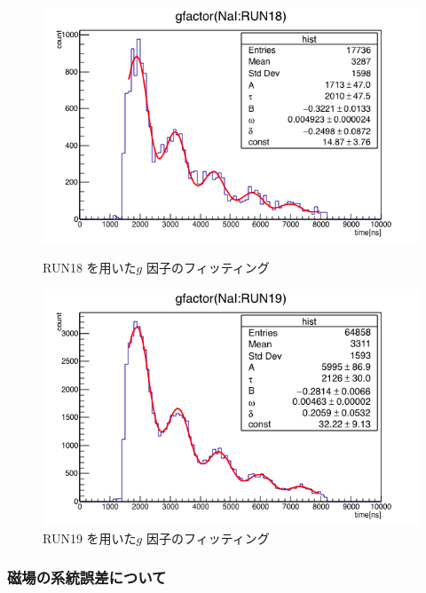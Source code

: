 \begin{figure}[H]
\begin{minipage}{0.5\hsize}
\includegraphics[width  = 1.0\textwidth]{figure/mino/gfactor_ratio_RUN18.png}
\caption{RUN18 を用いた$g$ 因子のフィッティング}
\end{minipage}
\begin{minipage}{0.5\hsize}
\includegraphics[width  = 1.0\textwidth]{figure/mino/gfactor_ratio_RUN19.png}
\caption{RUN19 を用いた$g$ 因子のフィッティング}
\end{minipage}
\end{figure}


\subsubsection{磁場の系統誤差について}

